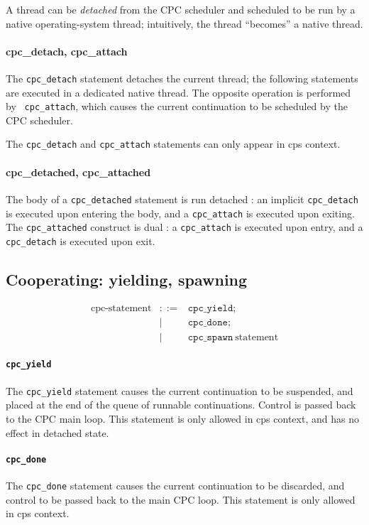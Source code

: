 \documentclass[a4paper]{report}
\begin{document}
A thread can be {\em detached\/} from the CPC scheduler and scheduled to be
run by a native operating-system thread; intuitively, the thread
``becomes'' a native thread.

\paragraph{cpc\_detach, cpc\_attach} The {\tt cpc\_detach} statement
detaches the current thread; the following statements are executed in a
dedicated native thread.  The opposite operation is performed by {\tt
  cpc\_attach}, which causes the current continuation to be scheduled by
the CPC scheduler.

The {\tt cpc\_detach} and {\tt cpc\_attach} statements can only appear in
cps context.

\paragraph{cpc\_detached, cpc\_attached} The body of a {\tt cpc\_detached}
statement is run detached : an implicit {\tt cpc\_detach} is executed upon
entering the body, and a {\tt cpc\_attach} is executed upon exiting.  The
{\tt cpc\_attached} construct is dual : a {\tt cpc\_attach} is executed
upon entry, and a {\tt cpc\_detach} is executed upon exit.

\subsection{Cooperating: yielding, spawning} \label{sec:cooperating}

\begin{eqnarray*}
\mbox{cpc-statement} & ::= & 
     \mathtt{cpc\_yield} \mathtt{;} \\
 &|& \mathtt{cpc\_done} \mathtt{;} \\
 &|& \mathtt{cpc\_spawn}\ \mbox{statement}
\end{eqnarray*}

\paragraph{\tt cpc\_yield} The {\tt cpc\_yield} statement causes the
current continuation to be suspended, and placed at the end of the queue of
runnable continuations.  Control is passed back to the CPC main loop.  This
statement is only allowed in cps context, and has no effect in detached
state.

\paragraph{\tt cpc\_done} The {\tt cpc\_done} statement causes the
current continuation to be discarded, and control to be passed back to
the main CPC loop.  This statement is only allowed in cps context.
\end{document}
